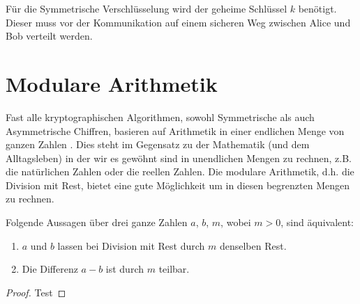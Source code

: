 \noindent
Für die Symmetrische Verschlüsselung wird der geheime Schlüssel $k$ benötigt. Dieser
muss vor der Kommunikation auf einem sicheren Weg zwischen Alice und Bob verteilt werden.

\section{Modulare Arithmetik}
Fast alle kryptographischen Algorithmen, sowohl Symmetrische als auch Asymmetrische Chiffren,
basieren auf Arithmetik in einer endlichen Menge von ganzen Zahlen \parencite[13]{BOOK:crypto}.
Dies steht im Gegensatz zu der Mathematik (und dem Alltagsleben)
in der wir es gewöhnt sind in unendlichen
Mengen zu rechnen, z.B. die natürlichen Zahlen oder die reellen Zahlen. Die modulare Arithmetik,
d.h. die Division mit Rest, bietet eine gute Möglichkeit um in diesen begrenzten Mengen zu rechnen.

\begin{lemma}
  Folgende Aussagen über drei ganze Zahlen $a$, $b$, $m$, wobei $m > 0$, sind äquivalent:
  \begin{enumerate}[label=\roman*), itemsep = 0pt]
    \item $a$ und $b$ lassen bei Division mit Rest durch $m$ denselben Rest.
    \item Die Differenz $a - b$ ist durch $m$ teilbar.
  \end{enumerate}
\end{lemma}
\begin{proof}
  Test
\end{proof}
